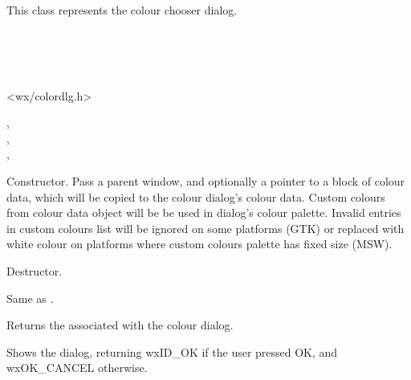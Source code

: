 \section{}\label{wxcolourdialog}

This class represents the colour chooser dialog.


\\
\\
\\


<wx/colordlg.h>


,\\
,\\
,\\


\label{wxcolourdialogctor}


Constructor. Pass a parent window, and optionally a pointer to a block of colour
data, which will be copied to the colour dialog's colour data. Custom
colours from colour data object will be be used in dialog's colour palette.
Invalid entries in custom colours list will be ignored on some platforms (GTK)
or replaced with white colour on platforms where custom colours palette has
fixed size (MSW).



\label{wxcolourdialogdtor}


Destructor.

\label{wxcolourdialogcreate}


Same as .

\label{wxcolourdialoggetcolourdata}


Returns the  associated with the colour dialog.

\label{wxcolourdialogshowmodal}


Shows the dialog, returning wxID\_OK if the user pressed OK, and wxOK\_CANCEL
otherwise.


